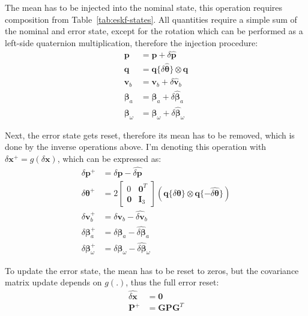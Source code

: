 The mean has to be injected into the nominal state, this operation requires composition from Table~\ref{tab:eskf-states}. All quantities require a simple sum of the nominal and error state, except for the rotation which can be performed as a left-side quaternion multiplication, therefore the injection procedure:
\begin{subequations}
\begin{align}
    \mathbf{p} &= \mathbf{p} + \delta\hat{\mathbf{p}} \\
    \mathbf{q} &= \mathbf{q}\{\delta\hat{\boldsymbol{\theta}}\}\otimes\mathbf{q} \\
    \mathbf{v}_b &= \mathbf{v}_b + \delta\hat{\mathbf{v}}_b \\
    \boldsymbol{\beta}_a &= \boldsymbol{\beta}_a + \delta\hat{\boldsymbol{\beta}}_a \\
    \boldsymbol{\beta}_\omega &= \boldsymbol{\beta}_\omega + \delta\hat{\boldsymbol{\beta}}_\omega
\end{align}
\end{subequations}

Next, the error state gets reset, therefore its mean has to be removed, which is done by the inverse operations above. I'm denoting this operation with $\delta\mathbf{x}^+=g(\delta\mathbf{x})$, which can be expressed as:
\begin{subequations}
\begin{align}
    \delta\mathbf{p}^+ &= \delta\mathbf{p} - \hat{\delta\mathbf{p}}\\
    \delta\boldsymbol{\theta}^+ &= 2\begin{bmatrix}
        0 & \mathbf{0}^T \\
        \mathbf{0} & \mathbf{I}_3
    \end{bmatrix}\left(\mathbf{q}\{\delta\boldsymbol{\theta}\}\otimes\mathbf{q}\{-\hat{\delta\boldsymbol{\theta}}\}\right) 
    \label{subeq:g-rotvec}\\
    \delta\mathbf{v}_b^+ &= \delta\mathbf{v}_{b} - \hat{\delta\mathbf{v}}_{b} \\
    \delta\boldsymbol{\beta}_{a}^+ &= \delta\boldsymbol{\beta}_{a} - \hat{\delta\boldsymbol{\beta}}_{a} \\
    \delta\boldsymbol{\beta}_{\omega}^+ &= \delta\boldsymbol{\beta}_{\omega} - \hat{\delta\boldsymbol{\beta}}_{\omega}
\end{align}
\end{subequations}

To update the error state, the mean has to be reset to zeros, but the covariance matrix update depends on $g(.)$, thus the full error reset:
\begin{subequations}
\begin{align}
    \hat{\delta\mathbf{x}} &=\mathbf{0} \\
    \mathbf{P}^+ &= \mathbf{G}\mathbf{P}\mathbf{G}^T
\end{align}    
\end{subequations}

